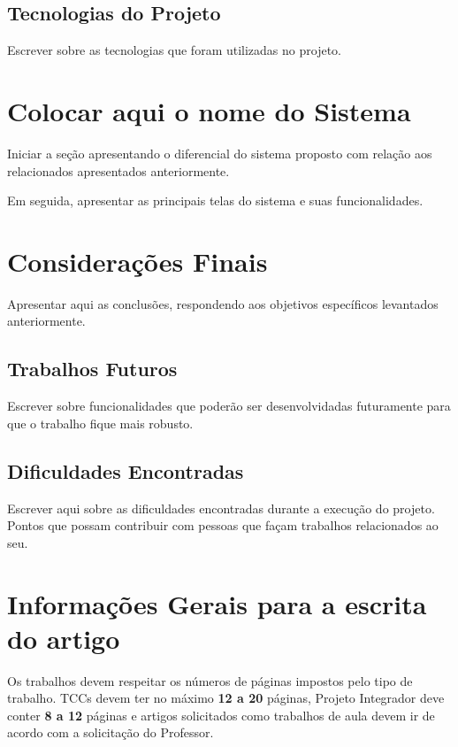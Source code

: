 \documentclass[12pt]{article}
\begin{document}
\subsection{Tecnologias do Projeto}

Escrever sobre as tecnologias que foram utilizadas no projeto.

\section{Colocar aqui o nome do Sistema}

Iniciar a seção apresentando o diferencial do sistema proposto com relação aos relacionados apresentados anteriormente.

Em seguida, apresentar as principais telas do sistema e suas funcionalidades.

\section{Considerações Finais}

Apresentar aqui as conclusões, respondendo aos objetivos específicos levantados anteriormente.

\subsection{Trabalhos Futuros}

Escrever sobre funcionalidades que poderão ser desenvolvidadas futuramente para que o trabalho fique mais robusto.

\subsection{Dificuldades Encontradas}

Escrever aqui sobre as dificuldades encontradas durante a execução do projeto. Pontos que possam contribuir com pessoas que façam trabalhos relacionados ao seu.




\section{Informações Gerais para a escrita do artigo}

Os trabalhos devem respeitar os números de páginas impostos pelo tipo de trabalho. TCCs devem ter no máximo \textbf{12 a 20} páginas, Projeto Integrador deve conter \textbf{8 a 12} páginas e artigos solicitados como trabalhos de aula devem ir de acordo com a solicitação do Professor.
\end{document}
